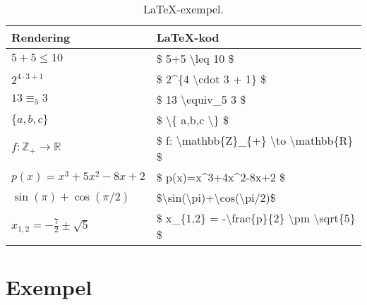 \documentclass[titlepage]{article}
\begin{document}
\begin{table}[h]
    \begin{center}
        \begin{tabular}{| l | l |}
            \hline
            \textbf{Rendering} & \textbf{\LaTeX-kod} \\
            \hline
            $5+5 \leq 10$ & \$ 5+5 \textbackslash leq 10 \$ \\
            \hline
            $2^{4\cdot3 + 1}$ & \$ 2\textasciicircum \{4 \textbackslash cdot 3 + 1\} \$ \\
            \hline
            $13 \equiv_5 3$ & \$ 13 \textbackslash equiv\_5 3 \$ \\
            \hline
            $\{a,b,c\}$ & \$ \textbackslash\{ a,b,c \textbackslash\} \$ \\
            \hline
            $f:\mathbb{Z}_{+} \to \mathbb{R}$ & \$ f: \textbackslash mathbb\{Z\}\_\{+\} \textbackslash to \textbackslash mathbb\{R\} \$ \\
            \hline
            $p(x)=x^3+5x^2-8x+2$ & \$ p(x)=x\textasciicircum 3+4x\textasciicircum 2-8x+2 \$ \\
            \hline
            $\sin(\pi)+\cos(\pi/2)$ & \$\textbackslash sin(\textbackslash pi)+\textbackslash cos(\textbackslash pi/2)\$ \\
            \hline
            $x_{1,2} = -\frac{7}{2} \pm \sqrt{5}$ & \$ x\_\{1,2\} = -\textbackslash frac\{p\}\{2\} \textbackslash pm \textbackslash sqrt\{5\} \$ \\
            \hline
        \end{tabular}
        \caption{\LaTeX-exempel.}
        \label{t3}
    \end{center}
\end{table}



\section{Exempel}



    
    
\end{document}
